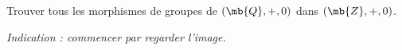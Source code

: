 
Trouver tous les morphismes de groupes de $(\mb{Q}, +, 0)$ dans $(\mb{Z}, +, 0)$.

\emph{Indication : commencer par regarder l'image.}

